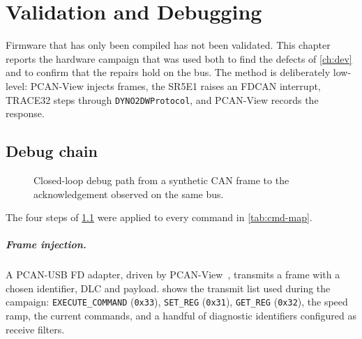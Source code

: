 \chapter{Validation and Debugging}
\label{ch:val}

Firmware that has only been compiled has not been validated. This chapter
reports the hardware campaign that was used both to find the defects of
\cref{ch:dev} and to confirm that the repairs hold on the bus. The
method is deliberately low-level: PCAN-View injects frames, the SR5E1
raises an FDCAN interrupt, TRACE32 steps through \texttt{DYNO2DWProtocol},
and PCAN-View records the response.

\section{Debug chain}
\label{sec:debug-chain}

\begin{figure}[ht]
\centering
{}
\caption{Closed-loop debug path from a synthetic CAN frame to the
acknowledgement observed on the same bus.}
\label{fig:debug-chain}
\end{figure}

The four steps of \cref{fig:debug-chain} were applied to every command in
\cref{tab:cmd-map}.

\paragraph{Frame injection.}
A PCAN-USB FD adapter, driven by PCAN-View~\cite{pcanview}, transmits a
frame with a chosen identifier, DLC and payload.  shows
the transmit list used during the campaign: \texttt{EXECUTE\_COMMAND}
(\texttt{0x33}), \texttt{SET\_REG} (\texttt{0x31}), \texttt{GET\_REG}
(\texttt{0x32}), the speed ramp, the current commands, and a handful of
diagnostic identifiers configured as receive filters.

